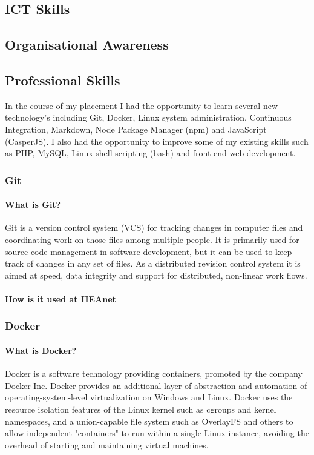 \documentclass{article}
\begin{document}
\subsection{ICT Skills}
\subsection{Organisational Awareness}
\subsection{Professional Skills}
In the course of my placement I had the opportunity to learn several new technology's including Git, Docker, Linux system administration, Continuous Integration, Markdown, Node Package Manager (npm) and JavaScript (CasperJS).
I also had the opportunity to improve some of my existing skills such as PHP, MySQL, Linux shell scripting (bash) and front end web development.
\subsubsection{Git}
\paragraph{What is Git?}
Git is a version control system (VCS) for tracking changes in computer files and coordinating work on those files among multiple people. It is primarily used for source code management in software development, but it can be used to keep track of changes in any set of files. As a distributed revision control system it is aimed at speed, data integrity and support for distributed, non-linear work flows.
\paragraph{How is it used at HEAnet}
\subsubsection{Docker}
\paragraph{What is Docker?}
Docker is a software technology providing containers, promoted by the company Docker Inc. Docker provides an additional layer of abstraction and automation of operating-system-level virtualization on Windows and Linux. Docker uses the resource isolation features of the Linux kernel such as cgroups and kernel namespaces, and a union-capable file system such as OverlayFS and others to allow independent "containers" to run within a single Linux instance, avoiding the overhead of starting and maintaining virtual machines.
\end{document}

